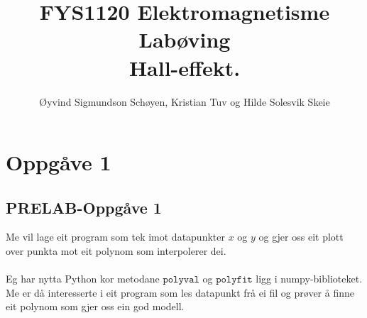 \documentclass[11pt, a4paper]{article}
\begin{document}
\begin{titlepage}

  \title{\normalsize FYS1120 Elektromagnetisme\\
    \vspace{10mm}
    \huge Labøving\\
    \vspace{10mm}
    \normalsize{\bf Hall-effekt.}}

  \author{Øyvind Sigmundson Schøyen, Kristian Tuv og Hilde Solesvik Skeie}

\end{titlepage}

\maketitle

\newpage
  \tableofcontents
\newpage

\section*{Oppgåve 1}

  \subsection*{PRELAB-Oppgåve 1}
    Me vil lage eit program som tek imot datapunkter $x$ og $y$ og gjer oss eit plott over punkta mot eit polynom som interpolerer dei. \\ \\
    Eg har nytta Python kor metodane $\texttt{polyval}$ og $\texttt{polyfit}$ ligg i numpy-biblioteket. Me er då interesserte i eit program som les datapunkt frå ei fil
    og prøver å finne eit polynom som gjer oss ein god modell.
    
\end{document}

